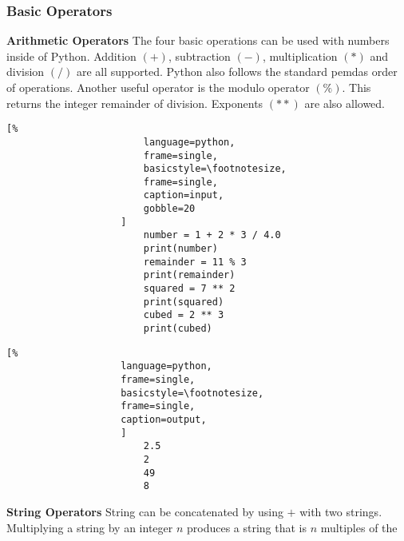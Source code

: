 \documentclass[crop=false,class=article,oneside]{standalone}
\begin{document}
        \subsubsection{Basic Operators}
            \textbf{Arithmetic Operators}
                The four basic operations can be used with numbers
                inside of Python. Addition $(+)$, subtraction $(-)$,
                multiplication $(*)$ and division $(/)$ are all
                supported. Python also follows the standard
                \gls{pemdas} order of operations. Another useful
                operator is the modulo operator $(\%)$. This returns
                the integer remainder of division. Exponents $(**)$
                are also allowed.\newline
                \begin{minipage}[t]{.48\textwidth}
                    \centering
                    \begin{lstlisting}[%
                        language=python,
                        frame=single,
                        basicstyle=\footnotesize,
                        frame=single,
                        caption=input,
                        gobble=20
                    ]
                        number = 1 + 2 * 3 / 4.0
                        print(number)
                        remainder = 11 % 3
                        print(remainder)
                        squared = 7 ** 2
                        print(squared)
                        cubed = 2 ** 3
                        print(cubed)
                    \end{lstlisting}
                \end{minipage}\hfill
                \begin{minipage}[t]{.48\textwidth}
                    \centering
                    \begin{lstlisting}[%
                    language=python,
                    frame=single,
                    basicstyle=\footnotesize,
                    frame=single,
                    caption=output,
                    ]
                        2.5
                        2
                        49
                        8
                    \end{lstlisting}
                \end{minipage}
            \textbf{String Operators}
                String can be concatenated by using $+$ with two
                strings. Multiplying a string by an integer $n$
                produces a string that is $n$ multiples of the
\end{document}

